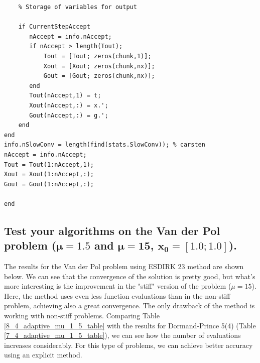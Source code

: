 \begin{lstlisting}[caption = ESDIRK23 method with adaptive time step size, captionpos=b, label=8_ESDIRK23_adaptive]
    %=====================================================================
    % Storage of variables for output
    
    if CurrentStepAccept
       nAccept = info.nAccept;
       if nAccept > length(Tout);
           Tout = [Tout; zeros(chunk,1)];
           Xout = [Xout; zeros(chunk,nx)];
           Gout = [Gout; zeros(chunk,nx)];
       end
       Tout(nAccept,1) = t;
       Xout(nAccept,:) = x.';
       Gout(nAccept,:) = g.';
    end
end
info.nSlowConv = length(find(stats.SlowConv)); % carsten
nAccept = info.nAccept;
Tout = Tout(1:nAccept,1);
Xout = Xout(1:nAccept,:);
Gout = Gout(1:nAccept,:);

end

\end{lstlisting}

\subsection{Test your algorithms on the Van der Pol problem \texorpdfstring{($\mathbf{\mu = 1.5}$ and $\mathbf{\mu = 15}$, $\mathbf{x_0 = [1.0;1.0]}$).}{(mu = 1.5 and mu = 15, x0 = [1.0;1.0]).}}
The results for the Van der Pol problem using ESDIRK 23 method are shown below. We can see that the convergence of the solution is pretty good, but what's more interesting is the improvement in the "stiff" version of the problem ($\mu = 15$). Here, the method uses even less function evaluations than in the non-stiff problem, achieving also a great convergence. The only drawback of the method is working with non-stiff problems. Comparing Table \ref{8_4_adaptive_mu_1_5_table} with the results for Dormand-Prince 5(4) (Table \ref{7_4_adaptive_mu_1_5_table}), we can see how the number of evaluations increases considerably. For this type of problems, we can achieve better accuracy using an explicit method.

